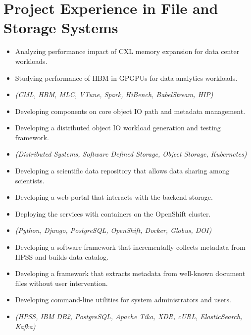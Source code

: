\section{Project Experience in File and Storage Systems}

\begin{itemize}
    \item {Analyzing performance impact of CXL memory expansion for data center workloads.}
    \item {Studying performance of HBM in GPGPUs for data analytics workloads.}
    \item {\it\small(CML, HBM, MLC, VTune, Spark, HiBench, BabelStream, HIP) }
\end{itemize}

\begin{itemize}
    \item {Developing components on core object IO path and metadata management.}
    \item {Developing a distributed object IO workload generation and testing framework.}
    \item {\it\small(Distributed Systems, Software Defined Storage, Object Storage, Kubernetes) }
\end{itemize}

\begin{itemize}
    \item {Developing a scientific data repository that allows data sharing among scientists.}
    \item {Developing a web portal that interacts with the backend storage.}
    \item {Deploying the services with containers on the OpenShift cluster.}
    \item {\it\small(Python, Django, PostgreSQL, OpenShift, Docker, Globus, DOI) }
\end{itemize}

\begin{itemize}
    \item {Developing a software framework that incrementally collects metadata from HPSS and builds data catalog.}
    \item {Developing a framework that extracts metadata from well-known document files without user intervention.}
    \item {Developing command-line utilities for system administrators and users.}
    \item {\it\small (HPSS, IBM DB2, PostgreSQL, Apache Tika, XDR, cURL, ElasticSearch, Kafka)}
\end{itemize}

